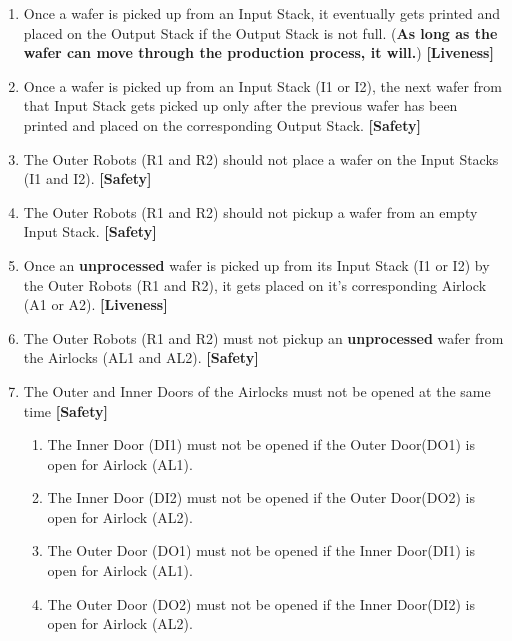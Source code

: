 \documentclass[a4paper,12pt]{article}
\begin{document}
	\begin{enumerate}
		\item Once a wafer is picked up from an Input Stack, it eventually gets printed and placed on the Output Stack if the Output Stack is not full. (\textbf{As long as the wafer can move through the production process, it will.}) \textbf{[Liveness]}
		\item Once a wafer is picked up from an Input Stack (I1 or I2), the next wafer from that Input Stack gets picked up only after the previous wafer has been printed and placed on the corresponding Output Stack. \textbf{[Safety]}
		\item The Outer Robots (R1 and R2) should not place a wafer on the Input Stacks (I1 and I2). \textbf{[Safety]}
		\item The Outer Robots (R1 and R2) should not pickup a wafer from an empty Input Stack. \textbf{[Safety]}
		\item Once an \textbf{unprocessed} wafer is picked up from its Input Stack (I1 or I2) by the Outer Robots (R1 and R2), it gets placed on it's corresponding Airlock (A1 or A2). \textbf{[Liveness]}
		\item The Outer Robots (R1 and R2) must not pickup an \textbf{unprocessed} wafer from the Airlocks (AL1 and AL2). \textbf{[Safety]}
		\item The Outer and Inner Doors of the Airlocks must not be opened at the same time \textbf{[Safety]}
		\begin{enumerate}
			\item The Inner Door (DI1) must not be opened if the Outer Door(DO1) is open for Airlock (AL1).
			
			\item The Inner Door (DI2) must not be opened if the Outer Door(DO2) is open for Airlock (AL2).
			
			\item The Outer Door (DO1) must not be opened if the Inner Door(DI1) is open for Airlock (AL1).
			
			\item The Outer Door (DO2) must not be opened if the Inner Door(DI2) is open for Airlock (AL2).
			

\end{enumerate}
\end{enumerate}
\end{document}
